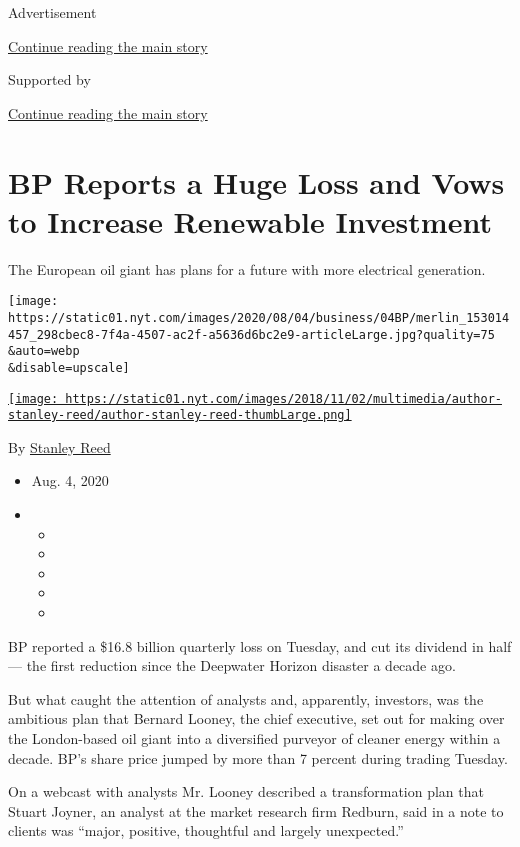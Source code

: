 Advertisement

\protect\hyperlink{after-top}{Continue reading the main story}

Supported by

\protect\hyperlink{after-sponsor}{Continue reading the main story}

\hypertarget{bp-reports-a-huge-loss-and-vows-to-increase-renewable-investment}{%
\section{BP Reports a Huge Loss and Vows to Increase Renewable
Investment}\label{bp-reports-a-huge-loss-and-vows-to-increase-renewable-investment}}

The European oil giant has plans for a future with more electrical
generation.

\texttt{[image: https://static01.nyt.com/images/2020/08/04/business/04BP/merlin\_153014457\_298cbec8-7f4a-4507-ac2f-a5636d6bc2e9-articleLarge.jpg?quality=75\\\&auto=webp\\\&disable=upscale]}

\href{https://www.nytimes.com/by/stanley-reed}{\texttt{[image: https://static01.nyt.com/images/2018/11/02/multimedia/author-stanley-reed/author-stanley-reed-thumbLarge.png]}}

By \href{https://www.nytimes.com/by/stanley-reed}{Stanley Reed}

\begin{itemize}
\item
  Aug. 4, 2020
\item
  \begin{itemize}
  \item
  \item
  \item
  \item
  \item
  \end{itemize}
\end{itemize}

BP reported a \$16.8 billion quarterly loss on Tuesday, and cut its
dividend in half --- the first reduction since the Deepwater Horizon
disaster a decade ago.

But what caught the attention of analysts and, apparently, investors,
was the ambitious plan that Bernard Looney, the chief executive, set out
for making over the London-based oil giant into a diversified purveyor
of cleaner energy within a decade. BP's share price jumped by more than
7 percent during trading Tuesday.

On a webcast with analysts Mr. Looney described a transformation plan
that Stuart Joyner, an analyst at the market research firm Redburn, said
in a note to clients was ``major, positive, thoughtful and largely
unexpected.''

